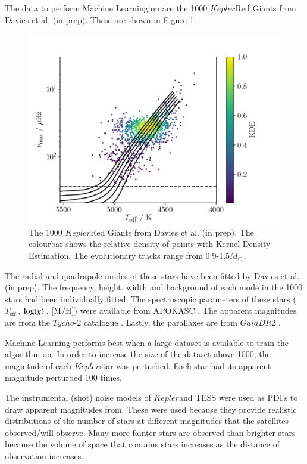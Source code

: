 \documentclass[a4paper,fleqn,usenatbib,useAMS]{mnras}
\newcommand{\teff}{\ensuremath{T_{\textrm{eff}}\:}}
\newcommand{\kep}{\ensuremath{Kepler}\:}
\newcommand{\msol}{\ensuremath{M_{\odot}\:}}
\newcommand{\logg}{\ensuremath{{\rm log}(g)\:}}
\begin{document}
The data to perform Machine Learning on are the 1000 \kep Red Giants from Davies et al. (in prep). These are shown in Figure \ref{fig:dataset}.
\begin{figure}
	\centering
	\includegraphics[scale=0.5]{Plot1_HR.pdf}
	\caption{The 1000 \kep Red Giants from Davies et al. (in prep). The colourbar shows the relative density of points with Kernel Density Estimation. The evolutionary tracks range from 0.9-1.5\msol.}	
	\label{fig:dataset}
\end{figure}
The radial and quadrapole modes of these stars have been fitted by Davies et al. (in prep). The frequency, height, width and background of each mode in the 1000 stars had been individually fitted. The spectroscopic parameters of these stars (\teff, \logg, [M/H]) were available from APOKASC \citet{pinsonneault_apokasc_2014}. The apparent magnitudes are from the $Tycho$-2 catalogue \citet{hog_tycho-2_2000}. Lastly, the parallaxes are from $Gaia DR2$ \citet{lindegren_gaia_2018}.

Machine Learning performs best when a large dataset is available to train the algorithm on. In order to increase the size of the dataset above 1000, the magnitude of each \kep star was perturbed. Each star had its apparent magnitude perturbed 100 times. 

The instrumental (shot) noise models of \kep and TESS were used as PDFs to draw apparent magnitudes from. These were used because they provide realistic distributions of the number of stars at different magnitudes that the satellites observed/will observe. Many more fainter stars are observed than brighter stars because the volume of space that contains stars increases as the distance of observation increases.
\end{document}
